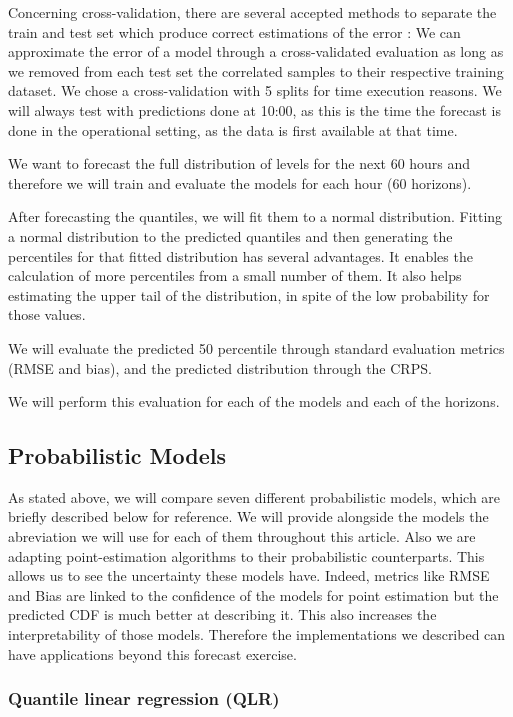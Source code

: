 \documentclass[a4paper,3p,sort&compress]{elsarticle}
\begin{document}
Concerning cross-validation, there are several accepted methods to
separate the train and test set which produce correct estimations of
the error \cite{bergmeir_note_2018}: We can approximate the error of 
a model through a cross-validated evaluation as long as
 we removed from each test set the correlated samples to their respective 
 training 
 dataset. We chose a cross-validation with 5 splits for time execution 
 reasons. We will always test with predictions done at
10:00, as this is the time the forecast is done in the operational
setting, as the data is first available at that time. 

We want to forecast the full distribution of \no
levels for the next 60 hours and therefore we will train and evaluate
the models for each hour (60 horizons).

After forecasting the quantiles, we will fit them to a normal
distribution. Fitting a normal distribution to the predicted quantiles
and then generating the percentiles for that fitted distribution has
several advantages. It enables the calculation of more percentiles
from a small number of them.  It also helps estimating the upper tail
of the distribution, in spite of the low probability for those values.

We will evaluate the predicted 50 percentile through standard
evaluation metrics (RMSE and bias), and the predicted
distribution through the CRPS.

We will perform this evaluation for each of the models and each of the horizons.

\subsection{Probabilistic Models}
\label{sec:models}

As stated above, we will compare seven different probabilistic models,
which are briefly described below for reference. We will provide 
alongside the models the abreviation we will use for each of them 
throughout this article. Also we are adapting point-estimation 
algorithms to their probabilistic counterparts. This allows 
us to see the uncertainty these models have. Indeed, metrics like 
RMSE and Bias are linked to the confidence of the models for 
point estimation but the predicted CDF is much better at describing 
it. This also increases the interpretability of those models.
Therefore 
the implementations we described can have applications beyond 
this forecast exercise.

\subsubsection{Quantile linear regression (QLR)}
\end{document}
